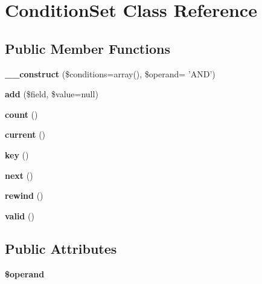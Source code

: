 \hypertarget{classConditionSet}{
\section{ConditionSet Class Reference}
\label{classConditionSet}
}
\subsection*{Public Member Functions}
\begin{DoxyCompactItemize}
\item 
\hypertarget{classConditionSet_a79360ca990ad41470c4144ad40bc021e}{
{\bfseries \_\-\_\-construct} (\$conditions=array(), \$operand= 'AND')}
\label{classConditionSet_a79360ca990ad41470c4144ad40bc021e}

\item 
\hypertarget{classConditionSet_a055c2094ca9a791022d4973881b765bd}{
{\bfseries add} (\$field, \$value=null)}
\label{classConditionSet_a055c2094ca9a791022d4973881b765bd}

\item 
\hypertarget{classConditionSet_a754cafa237c8c2ba709c70ade13c5897}{
{\bfseries count} ()}
\label{classConditionSet_a754cafa237c8c2ba709c70ade13c5897}

\item 
\hypertarget{classConditionSet_ac2f14aaef07c01963d35b2180129c778}{
{\bfseries current} ()}
\label{classConditionSet_ac2f14aaef07c01963d35b2180129c778}

\item 
\hypertarget{classConditionSet_a8f03d0b7c03410eb4dd236af92378233}{
{\bfseries key} ()}
\label{classConditionSet_a8f03d0b7c03410eb4dd236af92378233}

\item 
\hypertarget{classConditionSet_a3014542d7bd0e742bcc2e8c7ec4e7eeb}{
{\bfseries next} ()}
\label{classConditionSet_a3014542d7bd0e742bcc2e8c7ec4e7eeb}

\item 
\hypertarget{classConditionSet_a8ed1b6be6825adbb9fa6e9155dd50ae4}{
{\bfseries rewind} ()}
\label{classConditionSet_a8ed1b6be6825adbb9fa6e9155dd50ae4}

\item 
\hypertarget{classConditionSet_aa9d4391f48e476580e2689551c8ca3b5}{
{\bfseries valid} ()}
\label{classConditionSet_aa9d4391f48e476580e2689551c8ca3b5}

\end{DoxyCompactItemize}
\subsection*{Public Attributes}
\begin{DoxyCompactItemize}
\item 
\hypertarget{classConditionSet_aa5d81e376079364c63ac643bb3d2f308}{
{\bfseries \$operand}}
\label{classConditionSet_aa5d81e376079364c63ac643bb3d2f308}

\end{DoxyCompactItemize}

